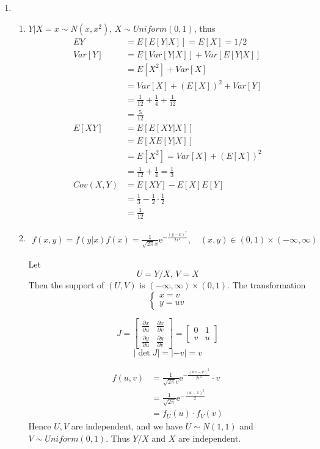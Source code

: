 \documentclass{article}
\begin{document}
\begin{enumerate}[leftmargin = 0 em, label = \arabic*., font = \bfseries]
\begin{enumerate}
		
	\end{enumerate}

\item 
\begin{enumerate}
	\item 
	$Y | X = x \sim N(x, x^2)$, $X \sim Uniform(0,1)$, thus
	\begin{align*}
	EY &= E[E[Y|X]] = E[X] = 1/2\\
	Var[Y] &= E[Var[Y|X]] + Var[E[Y|X]]\\
	& = E[X^2] + Var[X]\\
	& = Var[X] + (E[X])^2 + Var[Y]\\
	& = \frac{1}{12} + \frac{1}{4} + \frac{1}{12}\\
	& = \frac{5}{12}\\
	E[XY] &= E[E[XY|X]] \\
	& = E[X E[Y|X]] \\
	& = E[X^2] = Var[X] + (E[X])^2\\
	& = \frac{1}{12} + \frac{1}{4} = \frac{1}{3} \\
	Cov(X, Y) & = E[XY] - E[X] E[Y]\\
	& = \frac{1}{3} - \frac{1}{2} \cdot \frac{1}{2}\\
	& = \frac{1}{12}
	\end{align*}

	\item 
	\begin{align*}
	f(x, y ) = f(y|x) f(x) = \frac{1}{\sqrt{2 \pi}x} \mathrm{e}^{- \frac{(y - x)^2}{2 x^2}}, \quad (x,y)\in (0,1)\times (-\infty, \infty)
	\end{align*}

	Let
	\[U = Y/X,\, V = X\]
	Then the support of $(U,V)$ is $(-\infty, \infty) \times (0,1)$. The transformation
	\[\begin{cases}
		x = v\\
		y = uv
	\end{cases}\]

	\[J = \begin{bmatrix}
		\frac{\partial x}{\partial u} & \frac{\partial x}{\partial v}\\
		\frac{\partial y}{\partial u} & \frac{\partial y}{\partial v}
	\end{bmatrix}
	=
	\begin{bmatrix}
		0 & 1\\
		v & u
	\end{bmatrix}
	\]
	\[|\det J| = |-v| = v\]

	\begin{align*}
	f(u,v) & = \frac{1}{\sqrt{2 \pi}v} \mathrm{e}^{- \frac{(uv - v)^2}{2v^2}} \cdot v\\
	& = \frac{1}{\sqrt{2 \pi}} \mathrm{e}^{- \frac{(u-1)^2}{2}}\\
	& = f_U (u) \cdot f_V(v)
	\end{align*}
	Hence $U, V$ are independent, and we have
	$U \sim N(1,1)$ and $V \sim Uniform(0,1)$. Thus $Y/X$ and $X$ are independent.
	

\end{enumerate}
\end{enumerate}
\end{document}
